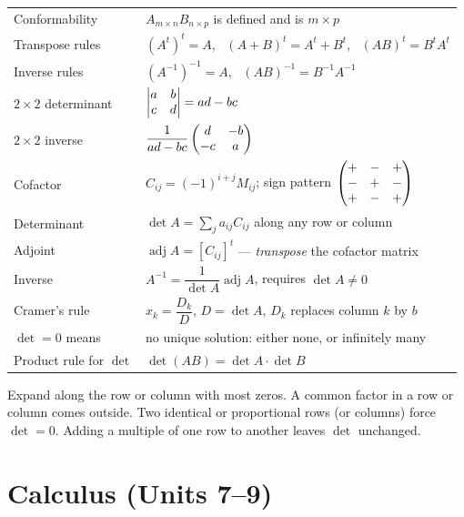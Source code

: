 \begin{center}
\small
\begin{tabular}{@{}L{5.0cm} L{10.6cm}@{}}
\toprule
Conformability & $A_{m\times n}B_{n\times p}$ is defined and is $m\times p$ \\
Transpose rules & $(A^{t})^{t}=A$, \ $(A+B)^{t}=A^{t}+B^{t}$, \
                  $\boxed{(AB)^{t}=B^{t}A^{t}}$ \\
Inverse rules & $(A^{-1})^{-1}=A$, \ $\boxed{(AB)^{-1}=B^{-1}A^{-1}}$ \\
$2\times2$ determinant & $\begin{vmatrix}a&b\\c&d\end{vmatrix}=ad-bc$ \\
$2\times2$ inverse & $\dfrac{1}{ad-bc}\begin{pmatrix}d&-b\\-c&a\end{pmatrix}$ \\
Cofactor & $C_{ij}=(-1)^{i+j}M_{ij}$; sign pattern $\begin{pmatrix}+&-&+\\-&+&-\\+&-&+\end{pmatrix}$ \\
Determinant & $\det A=\sum_j a_{ij}C_{ij}$ along any row or column \\
Adjoint & $\operatorname{adj}A=\left[C_{ij}\right]^{t}$ --- \emph{transpose} the
          cofactor matrix \\
Inverse & $A^{-1}=\dfrac{1}{\det A}\operatorname{adj}A$, requires $\det A\neq0$ \\
Cramer's rule & $x_k=\dfrac{D_k}{D}$, $D=\det A$, $D_k$ replaces column $k$
                 by $b$ \\
$\det=0$ means & no unique solution: either none, or infinitely many \\
Product rule for $\det$ & $\det(AB)=\det A\cdot\det B$ \\
\bottomrule
\end{tabular}
\end{center}

\begin{keyidea}
Expand along the row or column with most zeros. A common factor in a row or
column comes outside. Two identical or proportional rows (or columns) force
$\det=0$. Adding a multiple of one row to another leaves $\det$ unchanged.
\end{keyidea}

\section{Calculus (Units 7--9)}

